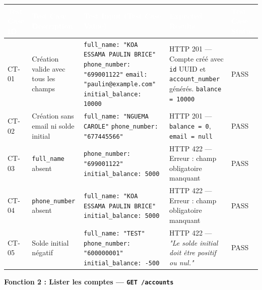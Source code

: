 \documentclass[12pt,a4paper]{article}
\begin{document}
\begin{longtable}{|L{1.6cm}|L{3.8cm}|L{5.2cm}|L{4.2cm}|L{1.8cm}|}
\hline
{}
\textbf{\textcolor{white}{Test Case ID}} & \textbf{\textcolor{white}{Test Case Description}} & \textbf{\textcolor{white}{Test Input (Test Case Value)}} & \textbf{\textcolor{white}{Expected Results}} & \textbf{\textcolor{white}{Test Case Status}} \\
\hline
CT-01 & Création valide avec tous les champs &
\texttt{full\_name: "KOA ESSAMA PAULIN BRICE"} \newline \texttt{phone\_number: "699001122"} \newline \texttt{email: "paulin@example.com"} \newline \texttt{initial\_balance: 10000} &
HTTP 201 — Compte créé avec \texttt{id} UUID et \texttt{account\_number} générés. \texttt{balance = 10000} & PASS \\
\hline
{}
CT-02 & Création sans email ni solde initial &
\texttt{full\_name: "NGUEMA CAROLE"} \newline \texttt{phone\_number: "677445566"} &
HTTP 201 — \texttt{balance = 0}, \texttt{email = null} & PASS \\
\hline
CT-03 & \texttt{full\_name} absent &
\texttt{phone\_number: "699001122"} \newline \texttt{initial\_balance: 5000} &
HTTP 422 — Erreur : champ obligatoire manquant & PASS \\
\hline
{}
CT-04 & \texttt{phone\_number} absent &
\texttt{full\_name: "KOA ESSAMA PAULIN BRICE"} \newline \texttt{initial\_balance: 5000} &
HTTP 422 — Erreur : champ obligatoire manquant & PASS \\
\hline
CT-05 & Solde initial négatif &
\texttt{full\_name: "TEST"} \newline \texttt{phone\_number: "600000001"} \newline \texttt{initial\_balance: -500} &
HTTP 422 — \textit{"Le solde initial doit être positif ou nul."} & PASS \\
\hline
\end{longtable}

\vspace{0.2cm}
{\bfseries\textcolor{danger}{Fonction 2 : Lister les comptes — \texttt{GET /accounts}}}
\vspace{0.1cm}
\end{document}
